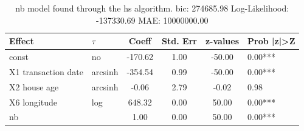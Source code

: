 \begin{table}
	\caption{nb model found through the hs algorithm. bic: 274685.98 Log-Likelihood: -137330.69 MAE: 10000000.00}
	\begin{center}
		\begin{tabular}{|l|l|c|c|c|l|}
			\hline
			Effect & $\tau$ & Coeff & Std. Err & z-values & Prob |z|>Z \\
			\hline
			const & no & -170.62 & 1.00 & -50.00 & 0.00*** \\
			\hline
			X1 transaction date & arcsinh & -354.54 & 0.99 & -50.00 & 0.00*** \\
			\hline
			X2 house age & arcsinh & -0.06 & 2.79 & -0.02 & 0.98 \\
			\hline
			X6 longitude & log & 648.32 & 0.00 & 50.00 & 0.00*** \\
			\hline
			nb &  & 1.00 & 0.00 & 50.00 & 0.00*** \\
			\hline
		\end{tabular}
	\end{center}
\end{table}